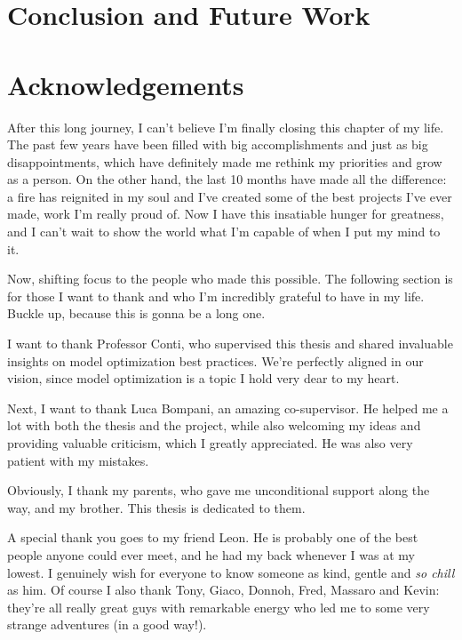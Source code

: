 \documentclass[12pt,a4paper,openright,twoside]{report}
\begin{document}
\chapter{Conclusion and Future Work}
\label{chap:conclusion}
\lhead[\fancyplain{}{\bfseries\thepage}]{\fancyplain{}{\bfseries\rightmark}}




\chapter*{Acknowledgements}
After this long journey, I can't believe I'm finally closing this chapter of my life. The past few years have been filled with big accomplishments and just as big disappointments, which have definitely made me rethink my priorities and grow as a person. On the other hand, the last 10 months have made all the difference: a fire has reignited in my soul and I've created some of the best projects I've ever made, work I'm really proud of. Now I have this insatiable hunger for greatness, and I can't wait to show the world what I'm capable of when I put my mind to it.

Now, shifting focus to the people who made this possible. The following section is for those I want to thank and who I'm incredibly grateful to have in my life. Buckle up, because this is gonna be a long one.

I want to thank Professor Conti, who supervised this thesis and shared invaluable insights on model optimization best practices. We're perfectly aligned in our vision, since model optimization is a topic I hold very dear to my heart.

Next, I want to thank Luca Bompani, an amazing co-supervisor. He helped me a lot with both the thesis and the project, while also welcoming my ideas and providing valuable criticism, which I greatly appreciated. He was also very patient with my mistakes.

Obviously, I thank my parents, who gave me unconditional support along the way, and my brother. This thesis is dedicated to them.

A special thank you goes to my friend Leon. He is probably one of the best people anyone could ever meet, and he had my back whenever I was at my lowest. I genuinely wish for everyone to know someone as kind, gentle and \textit{so chill} as him. Of course I also thank Tony, Giaco, Donnoh, Fred, Massaro and Kevin: they're all really great guys with remarkable energy who led me to some very strange adventures (in a good way!).
\end{document}
